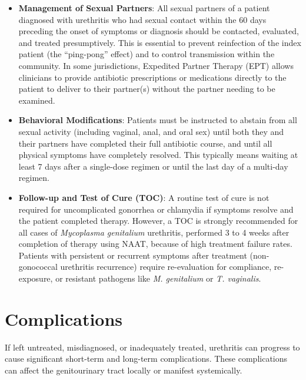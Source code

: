 \begin{itemize}
    \item \textbf{Management of Sexual Partners}: All sexual partners of a patient diagnosed with urethritis who had sexual contact within the 60 days preceding the onset of symptoms or diagnosis should be contacted, evaluated, and treated presumptively. This is essential to prevent reinfection of the index patient (the ``ping-pong'' effect) and to control transmission within the community. In some jurisdictions, Expedited Partner Therapy (EPT) allows clinicians to provide antibiotic prescriptions or medications directly to the patient to deliver to their partner(s) without the partner needing to be examined.

    \item \textbf{Behavioral Modifications}: Patients must be instructed to abstain from all sexual activity (including vaginal, anal, and oral sex) until both they and their partners have completed their full antibiotic course, and until all physical symptoms have completely resolved. This typically means waiting at least 7 days after a single-dose regimen or until the last day of a multi-day regimen.

    \item \textbf{Follow-up and Test of Cure (TOC)}: A routine test of cure is not required for uncomplicated gonorrhea or chlamydia if symptoms resolve and the patient completed therapy. However, a TOC is strongly recommended for all cases of \textit{Mycoplasma genitalium} urethritis, performed 3 to 4 weeks after completion of therapy using NAAT, because of high treatment failure rates. Patients with persistent or recurrent symptoms after treatment (non-gonococcal urethritis recurrence) require re-evaluation for compliance, re-exposure, or resistant pathogens like \textit{M. genitalium} or \textit{T. vaginalis}.
\end{itemize}

\section*{Complications}
If left untreated, misdiagnosed, or inadequately treated, urethritis can progress to cause significant short-term and long-term complications. These complications can affect the genitourinary tract locally or manifest systemically.

